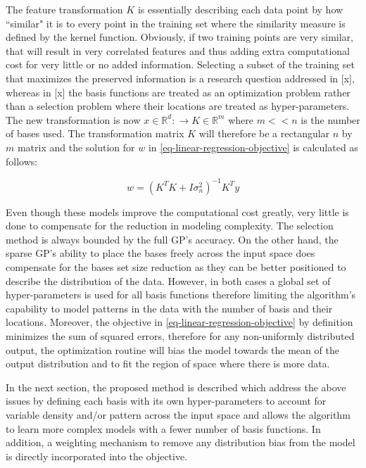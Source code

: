 \documentclass[useAMS,usenatbib,fleqn]{mn2e}
\begin{document}
The feature transformation $K$ is essentially describing each data point by how ``similar" it is to every point in the training set where the similarity measure is defined by the kernel function. Obviously, if two training points are very similar, that will result in very correlated features and thus adding extra computational cost for very little or no added information. Selecting a subset of the training set that maximizes the preserved information is a research question addressed in [x], whereas in [x] the basis functions are treated as an optimization problem rather than a selection problem where their locations are treated as hyper-parameters. The new transformation is now $x\in \mathbb{R}^{d}:\rightarrow K\in \mathbb{R}^{m}$ where $m<<n$ is the number of bases used. The transformation matrix $K$ will therefore be a rectangular $n$ by $m$ matrix and the solution for $w$ in \eqref{eq-linear-regression-objective} is calculated as follows:

\begin{equation}
\label{eq-linear-regression-objective-rectangular}
w = \left(K^{T}K+I\sigma_{n}^{2} \right)^{-1}K^{T}y
\end{equation}

Even though these models improve the computational cost greatly, very little is done to compensate for the reduction in modeling complexity. The selection method is always bounded by the full GP's accuracy. On the other hand, the sparse GP's ability to place the bases freely across the input space does compensate for the bases set size reduction as they can be better positioned to describe the distribution of the data. However, in both cases a global set of hyper-parameters is used for all basis functions therefore limiting the algorithm's capability to model patterns in the data with the number of basis and their locations. Moreover, the objective in \eqref{eq-linear-regression-objective} by definition minimizes the sum of squared errors, therefore for any non-uniformly distributed output, the optimization routine will bias the model towards the mean of the output distribution and to fit the region of space where there is more data.

In the next section, the proposed method is described which address the above issues by defining each basis with its own hyper-parameters to account for variable density and/or pattern across the input space and allows the algorithm to learn more complex models with a fewer number of basis functions. In addition, a weighting mechanism to remove any distribution bias from the model is directly incorporated into the objective.
\end{document}
